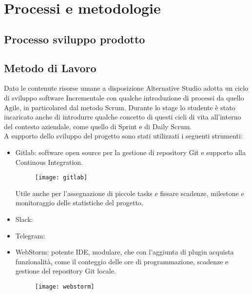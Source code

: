 
\chapter{Processi e metodologie}
\label{cap:processi-metodologie}


\section{Processo sviluppo prodotto}

\section{Metodo di Lavoro}

Dato le contenute risorse umane a disposizione Alternative Studio adotta un ciclo di sviluppo software \gls{Incrementale} con qualche introduzione di processi da quello \gls{Agile}, in particolared dal metodo \gls{Scrum}. Durante lo stage lo studente è stato incaricato anche di introdurre qualche concetto di questi cicli di vita all'interno del contesto aziendale, come quello di \gls{Sprint} e di \gls{Daily Scrum}. \\
\noindent A supporto dello sviluppo del progetto sono stati utilizzati i seguenti strumenti:
\begin{itemize}
	\item Gitlab: software open source per la gestione di repository \gls{Git} e supporto alla Continous Integration.
	\begin{figure}[htbp]
	\begin{center}
	\texttt{[image: gitlab]}
	\end{center}
	\end{figure}
  Utile anche per l'assegnazione di piccole tasks e fissare scadenze, milestone e monitoraggio delle statistiche del progetto.
  \item Slack:
  \item Telegram:
  \item WebStorm: potente IDE, modulare, che con l'aggiunta di plugin acquista funzionalità, come il conteggio delle ore di programmazione, scadenze e gestione del repository \gls{Git} locale.
  \begin{figure}[htbp]
  \begin{center}
  \texttt{[image: webstorm]}
  \end{center}
  \end{figure}
\end{itemize}
